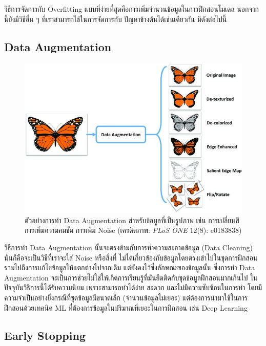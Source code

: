 วิธีการจัดการกับ Overfitting แบบที่ง่ายที่สุดคือการเพิ่มจำนวนข้อมูลในการฝึกสอนโมเดล นอกจากนี้ยังมีวิธีอื่น ๆ ที่เราสามารถใช้ในการจัดการกับ%
ปัญหาข้างต้นได้เช่นเดียวกัน มีดังต่อไปนี้

\subsection{Data Augmentation}
\label{ssec:data_aug}

\begin{figure}[H]
    \centering
    \includegraphics[width=0.9\linewidth]{fig/data_aug_butterfly.jpg}
    \caption{ตัวอย่างการทำ Data Augmentation สำหรับข้อมูลที่เป็นรูปภาพ เช่น การเปลี่ยนสี การเพิ่มความคมชัด การเพิ่ม Noise 
    (เครดิตภาพ: \textit{PLoS ONE} 12(8): e0183838)}
    \label{fig:data_aug_butterfly}
\end{figure}

วิธีการทำ Data Augmentation นั้นจะตรงข้ามกับการทำความสะอาดข้อมูล (Data Cleaning) นั่นก็คือจะเป็นวิธีที่เราจะใส่ Noise หรือสิ่งที่%
ไม่ได้เกี่ยวข้องกับข้อมูลโดยตรงเข้าไปในชุดการฝึกสอน รวมไปถึงการแก้ไขข้อมูลให้แตกต่างไปจากเดิม แต่ยังคงไว้ซึ่งลักษณะของข้อมูลนั้น 
ซึ่งการทำ Data Augmentation จะเป็นการช่วยไม่ใช่ให้เกิดการเรียนรู้ที่มันยึดติดกับชุดข้อมูลฝึกสอนมากเกินไป ในปัจจุบันวิธีการนี้ได้รับความนิยม%
เพราะสามารถทำได้ง่าย สะดวก และไม่มีความซับซ้อนในการทำ โดยมีความจำเป็นอย่างยิ่งกรณีที่ชุดข้อมูลมีขนาดเล็ก (จำนวนข้อมูลไม่เยอะ) 
แต่ต้องการนำมาใช้ในการฝึกสอนด้วยเทคนิค ML ที่ต้องการข้อมูลในปริมาณที่เยอะในการฝึกสอน เช่น Deep Learning\autocite{bengio2021}

\subsection{Early Stopping}
\label{ssec:early_stop}

